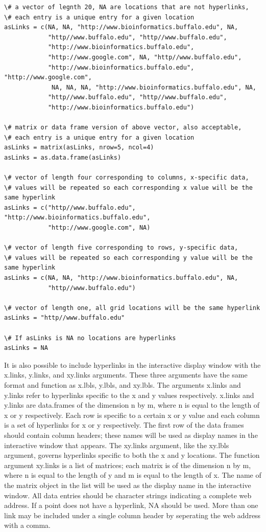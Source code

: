 \documentclass[]{article}
\begin{document}
\begin{verbatim}
\# a vector of legnth 20, NA are locations that are not hyperlinks,
\# each entry is a unique entry for a given location
asLinks = c(NA, NA, "http://www.bioinformatics.buffalo.edu", NA, 
            "http//www.buffalo.edu", "http//www.buffalo.edu",
            "http://www.bioinformatics.buffalo.edu",
            "http://www.google.com", NA, "http//www.buffalo.edu",
            "http://www.bioinformatics.buffalo.edu", "http://www.google.com", 
             NA, NA, NA, "http://www.bioinformatics.buffalo.edu", NA,
            "http//www.buffalo.edu", "http//www.buffalo.edu",
            "http://www.bioinformatics.buffalo.edu")

\# matrix or data frame version of above vector, also acceptable, 
\# each entry is a unique entry for a given location
asLinks = matrix(asLinks, nrow=5, ncol=4)
asLinks = as.data.frame(asLinks)

\# vector of length four corresponding to columns, x-specific data, 
\# values will be repeated so each corresponding x value will be the same hyperlink
asLinks = c("http//www.buffalo.edu", "http://www.bioinformatics.buffalo.edu", 
            "http://www.google.com", NA)

\# vector of length five corresponding to rows, y-specific data, 
\# values will be repeated so each corresponding y value will be the same hyperlink 
asLinks = c(NA, NA, "http://www.bioinformatics.buffalo.edu", NA,
            "http//www.buffalo.edu")

\# vector of length one, all grid locations will be the same hyperlink 
asLinks = "http//www.buffalo.edu"

\# If asLinks is NA no locations are hyperlinks 
asLinks = NA
\end{verbatim}


\indent It is also possible to include hyperlinks in the interactive display window with the x.links, y.links, and xy.links arguments. These three arguments have the same format and function as x.lbls, y.lbls, and xy.lbls. The arguments x.links and y.links refer to hyperlinks specific to the x and y values respectively. x.links and y.links are data.frames of the dimension n by m, where n is equal to the length of x or y respectively. Each row is specific to a certain x or y value and each column is a set of hyperlinks for x or y respectively. The first row of the data frames should contain column headers; these names will be used as display names in the interactive window that appears. The xy.links argument, like the  xy.lbls argument, governs hyperlinks specific to both the x and y locations. The function argument xy.links is a list of matrices; each matrix is of the dimension n by m, where n is equal to the length of y and m is equal to the length of x. The name of the matrix object in the list will be used as the display name in the interactive window. All data entries should be character strings indicating a complete web address. If a point does not have a hyperlink, NA should be used. More than one link may be included under a single column header by seperating the web address with a comma. \newline 
\end{document}
